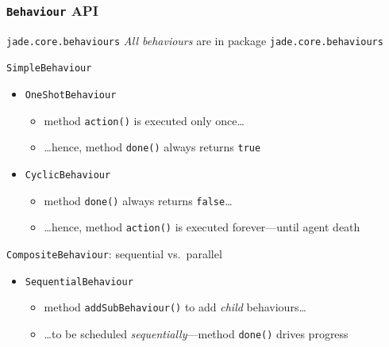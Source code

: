 \documentclass{beamer}\mode<presentation>{\usetheme{AMSCesenaPurpleAndGold}}
\begin{document}
\begin{frame}[c,allowframebreaks]\frametitle{\texttt{Behaviour} API}
    \begin{block}{\texttt{jade.core.behaviours}}
        \emph{All behaviours} are in package \alert{\texttt{jade.core.behaviours}}
    \end{block}
    \bigskip
    \begin{block}{\texttt{SimpleBehaviour}}
        \begin{itemize}
            \item \alert{\texttt{OneShotBehaviour}}
            \begin{itemize}
                \item method \texttt{action()} is executed only once\ldots
                \item \ldots hence, method \texttt{done()} always returns \texttt{true}
            \end{itemize}
            \item \alert{\texttt{CyclicBehaviour}}
            \begin{itemize}
                \item method \texttt{done()} always returns \texttt{false}\ldots
                \item \ldots hence, method \texttt{action()} is executed forever---until agent death
            \end{itemize}
        \end{itemize}
    \end{block}
    \begin{block}{\texttt{CompositeBehaviour}: sequential vs.\ parallel}
        \begin{itemize}
            \item \alert{\texttt{SequentialBehaviour}}
            \begin{itemize}
                \item method \texttt{addSubBehaviour()} to add \emph{child} behaviours\ldots
                \item \ldots to be scheduled \emph{sequentially}---method \texttt{done()} drives progress

\end{itemize}
\end{itemize}
\end{block}
\end{frame}
\end{document}
